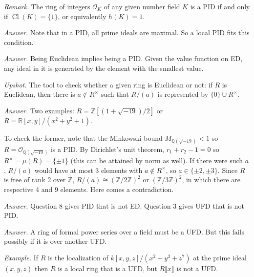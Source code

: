 \documentclass{mathproblems}
\newcommand\OO{\mathcal{O}}
\newcommand\Q{\mathbb{Q}}
\newcommand\R{\mathbb{R}}
\newcommand\Z{\mathbb{Z}}
\begin{document}
\begin{questions}
\textit{Remark.} The ring of integers $\OO_K$ of any given number field $K$ is a PID if and only if $\operatorname{Cl}(K)=\{1\}$, or equivalently $h(K)=1$.


\textit{Answer.} Note that in a PID, all prime ideals are maximal. So a local PID fits this condition.


\textit{Answer.} Being Euclidean implies being a PID. Given the value function on ED, any ideal in it is generated by the element with the smallest value.


{\color{violet}
\textit{Upshot.} The tool to check whether a given ring is Euclidean or not: if $R$ is Euclidean, then there is $a\notin R^\times$ such that $R/(a)$ is represented by $\{0\}\cup R^\times$.
}

\textit{Answer.} Two examples: $R=\Z[(1+\sqrt{-19})/2]$ or $R=\R[x,y]/(x^2+y^2+1)$. 

To check the former, note that the Minkowski bound $M_{\Q(\sqrt{-19})}<1$ so $R=\OO_{\Q(\sqrt{-19})}$ is a PID. By Dirichlet's unit theorem, $r_1+r_2-1=0$ so $R^\times=\mu(R)=\{\pm 1\}$ (this can be attained by norm as well). If there were such $a$, $R/(a)$ would have at most 3 elements with $a\notin R^\times$, so $a\in \{\pm 2,\pm 3\}$. Since $R$ is free of rank 2 over $\Z$, $R/(a)\cong (\Z/2\Z)^2$ or $(\Z/3\Z)^2$, in which there are respective 4 and 9 elements. Here comes a contradiction.


\textit{Answer.} Question 8 gives PID that is not ED. Question 3 gives UFD that is not PID.


\textit{Answer.} A ring of formal power series over a field must be a UFD. But this fails possibly if it is over another UFD. 

\textit{Example.} If $R$ is the localization of $k[x,y,z]/(x^2 + y^3 + z^7)$ at the prime ideal $(x,y,z)$ then $R$ is a local ring that is a UFD, but $R \llbracket x \rrbracket$ is not a UFD.



\end{questions}
\end{document}
